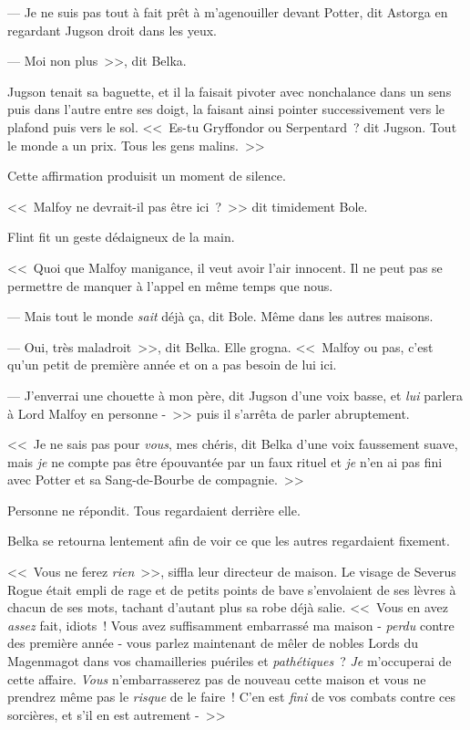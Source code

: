--- Je ne suis pas tout à fait prêt à m'agenouiller devant Potter, dit Astorga en regardant Jugson droit dans les yeux.

--- Moi non plus~>>, dit Belka.

Jugson tenait sa baguette, et il la faisait pivoter avec nonchalance dans un sens puis dans l'autre entre ses doigt, la faisant ainsi pointer successivement vers le plafond puis vers le sol. <<~Es-tu Gryffondor ou Serpentard~? dit Jugson. Tout le monde a un prix. Tous les gens malins.~>>

Cette affirmation produisit un moment de silence.

<<~Malfoy ne devrait-il pas être ici~?~>> dit timidement Bole.

Flint fit un geste dédaigneux de la main.

<<~Quoi que Malfoy manigance, il veut avoir l'air innocent. Il ne peut pas se permettre de manquer à l'appel en même temps que nous.

--- Mais tout le monde \emph{sait} déjà ça, dit Bole. Même dans les autres maisons.

--- Oui, très maladroit~>>, dit Belka. Elle grogna. <<~Malfoy ou pas, c'est qu'un petit de première année et on a pas besoin de lui ici.

--- J'enverrai une chouette à mon père, dit Jugson d'une voix basse, et \emph{lui} parlera à Lord Malfoy en personne -~>> puis il s'arrêta de parler abruptement.

<<~Je ne sais pas pour \emph{vous}, mes chéris, dit Belka d'une voix faussement suave, mais \emph{je} ne compte pas être épouvantée par un faux rituel et \emph{je} n'en ai pas fini avec Potter et sa Sang-de-Bourbe de compagnie.~>>

Personne ne répondit. Tous regardaient derrière elle.

Belka se retourna lentement afin de voir ce que les autres regardaient fixement.

<<~Vous ne ferez \emph{rien}~>>, siffla leur directeur de maison. Le visage de Severus Rogue était empli de rage et de petits points de bave s'envolaient de ses lèvres à chacun de ses mots, tachant d'autant plus sa robe déjà salie. <<~Vous en avez \emph{assez} fait, idiots~! Vous avez suffisamment embarrassé ma maison - \emph{perdu} contre des première année - vous parlez maintenant de mêler de nobles Lords du Magenmagot dans vos chamailleries puériles et \emph{pathétiques}~? \emph{Je} m'occuperai de cette affaire. \emph{Vous} n'embarrasserez pas de nouveau cette maison et vous ne prendrez même pas le \emph{risque} de le faire~! C'en est \emph{fini} de vos combats contre ces sorcières, et s'il en est autrement -~>>

